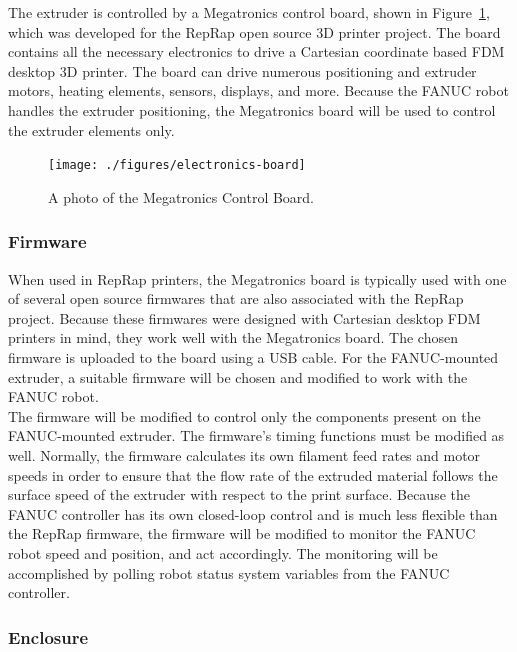 \indent 

The extruder is controlled by a Megatronics control board, shown in Figure~\ref{fig:megatronics}, which was developed for the RepRap open source 3D printer project. The board contains all the necessary electronics to drive a Cartesian coordinate based FDM desktop 3D printer. The board can drive numerous positioning and extruder motors, heating elements, sensors, displays, and more. Because the FANUC robot handles the extruder positioning, the Megatronics board will be used to control the extruder elements only.\\

\begin{figure}[htp]
\centering
\texttt{[image: ./figures/electronics-board]}
\caption{A photo of the Megatronics Control Board.}
\label{fig:megatronics}
\end{figure}

\subsubsection{Firmware}

\indent

When used in RepRap printers, the Megatronics board is typically used with one of several open source firmwares that are also associated with the RepRap project. Because these firmwares were designed with Cartesian desktop FDM printers in mind, they work well with the Megatronics board. The chosen firmware is uploaded to the board using a USB cable. For the FANUC-mounted extruder, a suitable firmware will be chosen and modified to work with the FANUC robot.\\

The firmware will be modified to control only the components present on the FANUC-mounted extruder. The firmware's timing functions must be modified as well. Normally, the firmware calculates its own filament feed rates and motor speeds in order to ensure that the flow rate of the extruded material follows the surface speed of the extruder with respect to the print surface. Because the FANUC controller has its own closed-loop control and is much less flexible than the RepRap firmware, the firmware will be modified to monitor the FANUC robot speed and position, and act accordingly. The monitoring will be accomplished by polling robot status system variables from the FANUC controller.

\subsubsection{Enclosure}

